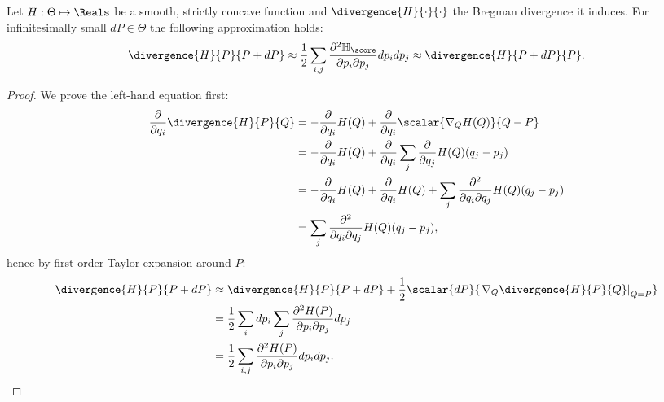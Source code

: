 \begin{statement}
	Let $H:\Theta\mapsto\Reals$ be a smooth, strictly concave function and $\divergence{H}{\cdot}{\cdot}$ the Bregman divergence it induces. For infinitesimally small $dP\in\Theta$ the following approximation holds:
	\begin{equation}
		\divergence{H}{P}{P+ dP} \approx \frac{1}{2} \sum_{i,j} \frac{\partial^2 \mathbb{H}_{\score}}{\partial p_i\partial p_j} dp_{i} dp_{j} \approx   \divergence{H}{P + dP}{P}.
	\end{equation}
	\begin{proof}
		We prove the left-hand equation first:
		\begin{align}
			\frac{\partial}{\partial q_i} \divergence{H}{P}{Q} &=  -\frac{\partial}{\partial q_i} H(Q) +    \frac{\partial}{\partial q_i}\scalar{\nabla_{Q} H(Q)}{Q-P}\\
				&=  - \frac{\partial}{\partial q_i} H(Q) +  \frac{\partial}{\partial q_i}\sum_{j} \frac{\partial}{\partial q_j} H(Q) (q_j - p_j)\\
				&= - \frac{\partial}{\partial q_i} H(Q)  + \frac{\partial}{\partial q_i} H(Q) + \sum_{j} \frac{\partial^2}{\partial q_i \partial q_j} H(Q) (q_j - p_j)\\
				&= \sum_{j} \frac{\partial^2}{\partial q_i \partial q_j} H(Q) (q_j - p_j),
		\end{align}
		hence by first order Taylor expansion around $P$:
		\begin{align}
			\divergence{H}{P}{P+dP} &\approx  \divergence{H}{P}{P+dP}+ \frac{1}{2}\scalar{dP}{\left.\nabla_{Q}\divergence{H}{P}{Q}\right\rvert_{Q=P}}\\
				&= \frac{1}{2} \sum_{i} dp_i \sum_{j} \frac{\partial^2 H(P)}{\partial p_i\partial p_j} dp_j \\
				&= \frac{1}{2} \sum_{i,j} \frac{\partial^2 H(P)}{\partial p_i\partial p_j} dp_{i} dp_j.
		\end{align}
		

\end{proof}
\end{statement}
